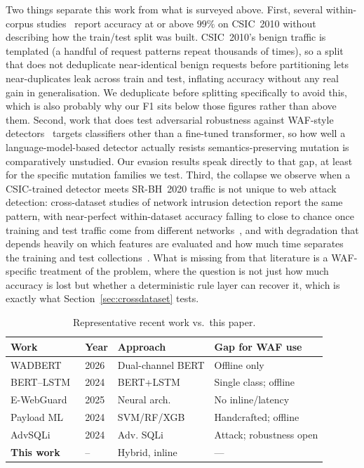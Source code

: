 \documentclass[conference]{IEEEtran}
\begin{document}
Two things separate this work from what is surveyed above. First, several
within-corpus studies~\cite{scireports2024novelxsssqli,liu2024bertlstm}
report accuracy at or above $99\%$ on CSIC~2010 without describing how the
train/test split was built. CSIC~2010's benign traffic is templated (a
handful of request patterns repeat thousands of times), so a split that
does not deduplicate near-identical benign requests before
partitioning lets near-duplicates leak across train and test, inflating
accuracy without any real gain in generalisation. We deduplicate before
splitting specifically to avoid this, which is also probably why our F1
sits below those figures rather than above them. Second, work that does
test adversarial robustness against WAF-style
detectors~\cite{advsqli2024,mlwaf2025peerj} targets classifiers other than
a fine-tuned transformer, so how well a language-model-based detector
actually resists semantics-preserving mutation is comparatively unstudied.
Our evasion results speak directly to that gap, at least for the specific
mutation families we test. Third, the collapse we observe when a
CSIC-trained detector meets SR-BH~2020 traffic is not unique to web
attack detection: cross-dataset studies of network intrusion detection
report the same pattern, with near-perfect within-dataset accuracy
falling to close to chance once training and test traffic come from
different networks~\cite{cantone2024crossdataset}, and with degradation
that depends heavily on which features are evaluated and how much time
separates the training and test collections~\cite{venkatesan2026crossdataset}.
What is missing from that literature is a WAF-specific treatment of the
problem, where the question is not just how much accuracy is lost but
whether a deterministic rule layer can recover it, which is exactly what
Section~\ref{sec:crossdataset} tests.

\begin{table}[t]
\centering
\caption{Representative recent work vs.\ this paper.}
\label{tab:survey}
\footnotesize
\begin{tabular}{@{}p{2.2cm}p{0.6cm}p{1.7cm}p{2.2cm}@{}}
\toprule
Work & Year & Approach & Gap for WAF use \\
\midrule
WADBERT~\cite{wadbert2026} & 2026 & Dual-channel BERT & Offline only \\
BERT--LSTM~\cite{liu2024bertlstm} & 2024 & BERT+LSTM & Single class; offline \\
E-WebGuard~\cite{zhou2025ewebguard} & 2025 & Neural arch. & No inline/latency \\
Payload ML~\cite{payloadml2024svmrfxgb} & 2024 & SVM/RF/XGB & Handcrafted; offline \\
AdvSQLi~\cite{advsqli2024} & 2024 & Adv. SQLi & Attack; robustness open \\
\textbf{This work} & -- & Hybrid, inline & --- \\
\bottomrule
\end{tabular}
\end{table}
\end{document}

